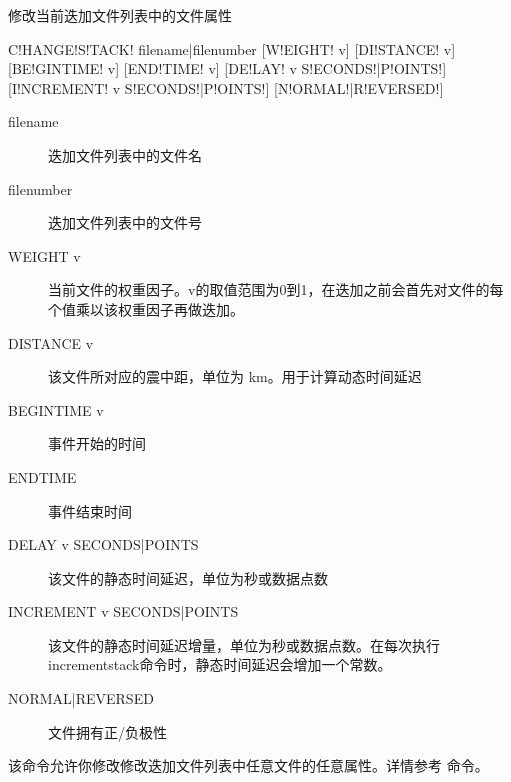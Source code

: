 \label{sss:changestack}

修改当前迭加文件列表中的文件属性

\begin{SACSTX}
C!HANGE!S!TACK! filename|filenumber [W!EIGHT! v] [DI!STANCE! v]
    [BE!GINTIME! v] [END!TIME! v] [DE!LAY! v S!ECONDS!|P!OINTS!]
    [I!NCREMENT! v S!ECONDS!|P!OINTS!] [N!ORMAL!|R!EVERSED!]
\end{SACSTX}

\begin{description}
\item [filename] 迭加文件列表中的文件名
\item [filenumber] 迭加文件列表中的文件号
\item [WEIGHT v] 当前文件的权重因子。v的取值范围为0到1，在迭加之前会首先对文件的每个值乘以该权重因子再做迭加。
\item [DISTANCE v] 该文件所对应的震中距，单位为 \si{\km}。用于计算动态时间延迟
\item [BEGINTIME v] 事件开始的时间
\item [ENDTIME] 事件结束时间
\item [DELAY v SECONDS|POINTS] 该文件的静态时间延迟，单位为秒或数据点数
\item [INCREMENT v SECONDS|POINTS] 该文件的静态时间延迟增量，单位为秒或数据点数。在每次执行incrementstack命令时，静态时间延迟会增加一个常数。
\item [NORMAL|REVERSED] 文件拥有正/负极性
\end{description}

该命令允许你修改修改迭加文件列表中任意文件的任意属性。详情参考  命令。
